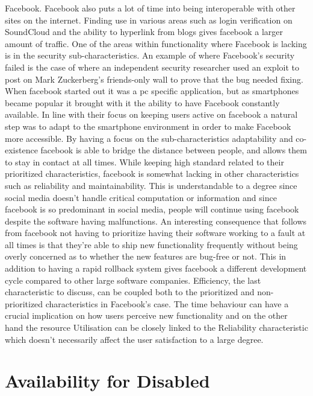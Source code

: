 \documentclass[conference]{IEEEtran}
\begin{document}
Facebook. Facebook also puts a lot of time into being interoperable with other
sites on the internet. Finding use in various areas such as login verification
on SoundCloud and the ability to hyperlink from blogs gives facebook a larger
amount of  traffic. One of the areas within functionality where Facebook is
lacking is in the security sub-characteristics. An example of where Facebook’s
security failed is the case of where an independent security researcher used an
exploit to post on Mark Zuckerberg’s friends-only wall to prove that the bug
needed fixing.          When facebook started out it was a pc specific
application, but as smartphones became popular it brought with it the ability
to have Facebook constantly available. In line with their focus on keeping
users active on facebook a natural step was to adapt to the smartphone
environment in order to make Facebook more accessible. By having a focus on the
sub-characteristics adaptability and co-existence facebook is able to bridge
the distance between people, and allows them to stay in contact at all times.
While keeping high standard related to their prioritized characteristics,
facebook is somewhat lacking in other characteristics such as reliability and
maintainability.  This is understandable to a degree since social media doesn’t
handle critical computation or information and since facebook is so predominant
in social media, people will continue using facebook despite the software
having malfunctions. An interesting consequence that follows from facebook not
having to prioritize having their software working to a fault at all times is
that they’re able to ship new functionality frequently without being overly
concerned as to whether the new features are bug-free or not. This in addition
to having a rapid rollback system gives facebook a different development cycle
compared to other large software companies. Efficiency, the last characteristic
to discuss, can be coupled both to the prioritized and non-prioritized
characteristics in Facebook’s case. The time behaviour can have a crucial
implication on how users perceive new functionality and on the other hand the
resource Utilisation can be closely linked to the Reliability characteristic
which doesn’t necessarily affect the user satisfaction to a large degree. 


\section{Availability for Disabled}
\label{availability}
\end{document}
